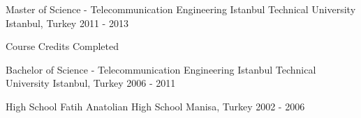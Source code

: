 

\begin{cventries}

  \cventry
    {Master of Science - Telecommunication Engineering} %
    {Istanbul Technical University} %
    {Istanbul, Turkey} %
    {2011 - 2013} %
    {
      \begin{cvitems} %
        \item {Course Credits Completed}
      \end{cvitems}
    }

  \cventry
    {Bachelor of Science - Telecommunication Engineering} %
    {Istanbul Technical University} %
    {Istanbul, Turkey} %
    {2006 - 2011} %
    {}

  \cventry
    {High School} %
    {Fatih Anatolian High School} %
    {Manisa, Turkey} %
    {2002 - 2006} %
    {}

\end{cventries}
